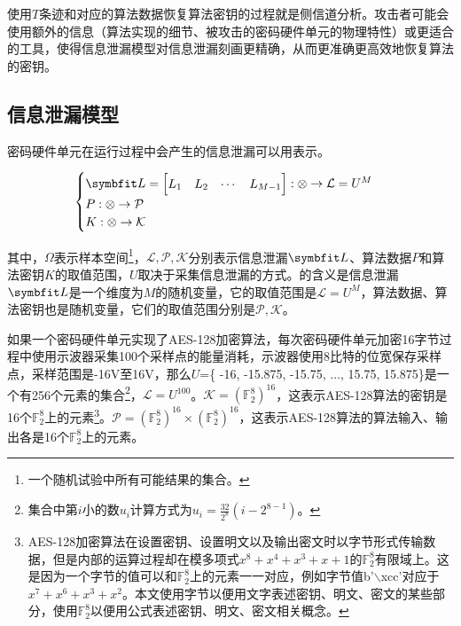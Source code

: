 {	使用$T$条迹和对应的算法数据恢复算法密钥的过程就是侧信道分析。攻击者可能会使用额外的信息（算法实现的细节、被攻击的密码硬件单元的物理特性）或更适合的工具，使得信息泄漏模型对信息泄漏刻画更精确，从而更准确更高效地恢复算法的密钥。
	
	\subsection{信息泄漏模型}
	
	密码硬件单元在运行过程中会产生的信息泄漏可以用表示。
	
	\begin{equation}
		\begin{cases}
			\Vector L=\begin{bmatrix}L_1&L_2&\cdots&L_{M-1}\end{bmatrix}:\mathcal \Omega\rightarrow \mathcal L=U^{M}\\
			P:\mathcal \Omega\rightarrow \mathcal P\\
			K:\mathcal \Omega\rightarrow \mathcal K
		\end{cases}\label{eq:leakagemodel}
	\end{equation}
	
	\noindent 其中，$\Omega$表示样本空间\footnote{一个随机试验中所有可能结果的集合。}，$\mathcal L,\mathcal P,\mathcal K$分别表示信息泄漏$\Vector L$、算法数据$P$和算法密钥$K$的取值范围，$U$取决于采集信息泄漏的方式。的含义是信息泄漏$\Vector L$是一个维度为$M$的随机变量，它的取值范围是$\mathcal L=U^M$，算法数据、算法密钥也是随机变量，它们的取值范围分别是$\mathcal P, \mathcal K$。
	
	\begin{example}
		如果一个密码硬件单元实现了AES-128加密算法，每次密码硬件单元加密16字节过程中使用示波器采集100个采样点的能量消耗，示波器使用8比特的位宽保存采样点，采样范围是-16V至16V，那么$U$=\{ -16, -15.875, -15.75, $\dots$, 15.75, 15.875\}是一个有256个元素的集合\footnote{集合中第$i$小的数$u_i$计算方式为$u_i=\frac{32}{2^8}(i-2^{8-1})$。}，$\mathcal L=U^{100}$。$\mathcal K=\left( {\mathbb F_2^8}\right) ^{16}$，这表示AES-128算法的密钥是16个$\mathbb F_2^8$上的元素\footnote{AES-128加密算法在设置密钥、设置明文以及输出密文时以字节形式传输数据，但是内部的运算过程却在模多项式$x^8+x^4+x^3+x+1$的$\mathbb F_2^8$有限域上。这是因为一个字节的值可以和$\mathbb F_2^8$上的元素一一对应，例如字节值b'$\backslash$xcc'对应于$x^7+x^6+x^3+x^2$。本文使用字节以便用文字表述密钥、明文、密文的某些部分，使用$\mathbb F_2^8$以便用公式表述密钥、明文、密文相关概念。}。$\mathcal P=\left( {\mathbb F_2^8}\right) ^{16}\times \left( {\mathbb F_2^8}\right) ^{16}$，这表示AES-128算法的算法输入、输出各是16个$\mathbb F_2^8$上的元素。
	\end{example}
	
}
